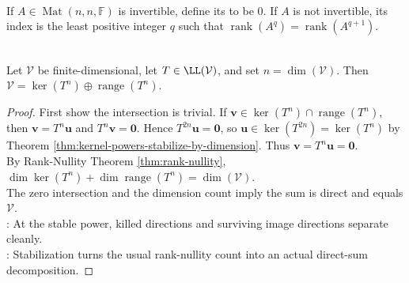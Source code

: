 \begin{definition} \label{def:matrix-index} \\
If $A\in\operatorname{Mat}(n,n,\mathbb{F})$ is invertible, define its  to be $0$. If $A$ is not invertible, its index is the least positive integer $q$ such that $\operatorname{rank}(A^q)=\operatorname{rank}(A^{q+1})$.
\end{definition}

\begin{theorem} \label{thm:kernel-range-stable-direct-sum} \\
Let $\mathcal{V}$ be finite-dimensional, let $T\in\LL(\mathcal{V})$, and set $n=\dim(\mathcal{V})$. Then $\mathcal{V}=\ker(T^n)\oplus\operatorname{range}(T^n)$.
\begin{proof}
First show the intersection is trivial. If $\mathbf{v}\in\ker(T^n)\cap\operatorname{range}(T^n)$, then $\mathbf{v}=T^n\mathbf{u}$ and $T^n\mathbf{v}=\mathbf{0}$. Hence $T^{2n}\mathbf{u}=\mathbf{0}$, so $\mathbf{u}\in\ker(T^{2n})=\ker(T^n)$ by Theorem \ref{thm:kernel-powers-stabilize-by-dimension}. Thus $\mathbf{v}=T^n\mathbf{u}=\mathbf{0}$.\\
By Rank-Nullity Theorem \ref{thm:rank-nullity}, $\dim\ker(T^n)+\dim\operatorname{range}(T^n)=\dim(\mathcal{V})$.\\
The zero intersection and the dimension count imply the sum is direct and equals $\mathcal{V}$.\\
: At the stable power, killed directions and surviving image directions separate cleanly.\\
: Stabilization turns the usual rank-nullity count into an actual direct-sum decomposition.
\end{proof}
\end{theorem}

